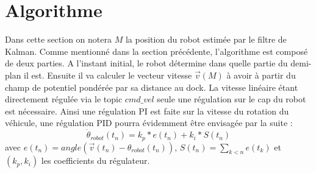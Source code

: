 \documentclass[12pt]{report}
\begin{document}
\section{Algorithme}

Dans cette section on notera $M$ la position du robot estimée par le filtre de Kalman. Comme mentionné dans la section précédente, l'algorithme est composé de deux parties. A l'instant initial, le robot détermine dans quelle partie du demi-plan il est. Ensuite il va calculer le vecteur vitesse $\overrightarrow{v}(M)$ à avoir à partir du champ de potentiel pondérée par sa distance au dock. La vitesse linéaire étant directement régulée via le topic $cmd\_vel$ seule une régulation sur le cap du robot est nécessaire. Ainsi une régulation PI est faite sur la vitesse du rotation du véhicule, une régulation PID pourra évidemment être envisagée par la suite : 
\[\dot{\theta}_{robot}(t_n)=k_p*e(t_n)+k_i*S(t_n)\]
avec $e(t_n)=angle(\overrightarrow{v}(t_n)-\theta_{robot}(t_n))$, $S(t_n) = \sum_{k<n}{e(t_k)}$ et $(k_p,k_i)$ les coefficients du régulateur. 
\end{document}
